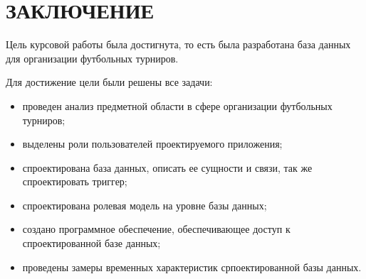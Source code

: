 \section*{\centering ЗАКЛЮЧЕНИЕ}

Цель курсовой работы была достигнута, то есть была разработана база данных для организации футбольных турниров.

Для достижение цели были решены все задачи:

\begin{itemize}
	\item проведен анализ предметной области в сфере организации футбольных турниров;
	\item выделены роли пользователей проектируемого приложения;
	\item спроектирована база данных, описать ее сущности и связи, так же спроектировать триггер;
	\item спроектирована ролевая модель на уровне базы данных;
	\item создано программное обеспечение, обеспечивающее доступ к спроектированной базе данных;
	\item проведены замеры временных характеристик српоектированной базы данных.  
\end{itemize}